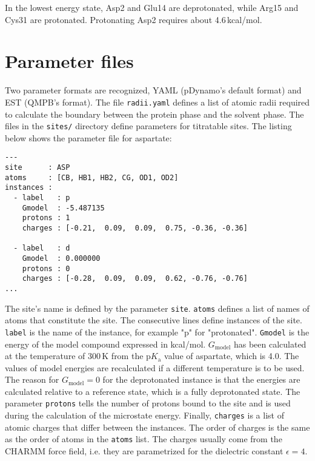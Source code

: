 \documentclass[a4paper,11pt]{article}
\newcommand{\pka}{$\mathrm{p}K_{\mathrm{a}}$\xspace}
\begin{document}
{\bigskip
In the lowest energy state, Asp2 and Glu14 are deprotonated, while Arg15 and Cys31
are protonated.
%
Protonating Asp2 requires about 4.6\,kcal/mol.


\section{Parameter files}
Two parameter formats are recognized, 
YAML (pDynamo's default format) and EST (QMPB's format).
%
The file \texttt{radii.yaml} defines a list of atomic radii 
required to calculate the boundary between the protein phase and 
the solvent phase.
%
The files in the \texttt{sites/} directory define parameters for titratable 
sites.
%
The listing below shows the parameter file for aspartate:

\newpage

\linespread{0.8}
{\footnotesize \begin{lstlisting}
---
site      : ASP
atoms     : [CB, HB1, HB2, CG, OD1, OD2]
instances :
  - label   : p
    Gmodel  : -5.487135
    protons : 1
    charges : [-0.21,  0.09,  0.09,  0.75, -0.36, -0.36]

  - label   : d
    Gmodel  : 0.000000
    protons : 0
    charges : [-0.28,  0.09,  0.09,  0.62, -0.76, -0.76]
...
\end{lstlisting} }
\linespread{1.6}


\bigskip
The site's name is defined by the parameter \texttt{site}. 
%
\texttt{atoms} defines a list of names of atoms that constitute the site.
%
The consecutive lines define instances of the site.
%
\texttt{label} is the name of the instance, for example "p" for "protonated".
%
\texttt{Gmodel} is the energy of the model compound expressed in kcal/mol.
%
$G_{\mathrm{model}}$ has been calculated at the temperature of 300\,K from the 
\pka value of aspartate, which is 4.0.
%
The values of model energies are recalculated if a different temperature is 
to be used.
%
The reason for $G_{\mathrm{model}} = 0$ for the deprotonated instance is that 
the energies are calculated relative to a reference state, which is a fully 
deprotonated state.
%
The parameter \texttt{protons} tells the number of protons bound to the site and 
is used during the calculation of the microstate energy.
%
Finally, \texttt{charges} is a list of atomic charges that differ between 
the instances.
%
The order of charges is the same as the order of atoms in the \texttt{atoms} list.
%
The charges usually come from the CHARMM force field, i.e. they are
parametrized for the dielectric constant $\epsilon = 4$.

}
\end{document}
